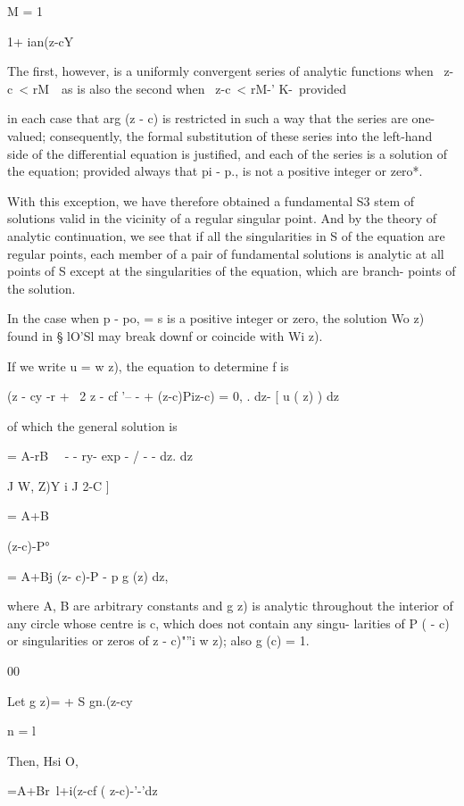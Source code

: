 M = 1

1+ ian(z-cY

The first, however, is a uniformly convergent series of analytic
functions when \ z-c\ < rM~\ as is also the second when \ z-c\ < rM-'
K-\ provided

%
%

in each case that arg (z - c) is restricted in such a way that the
series are one-valued; consequently, the formal substitution of these
series into the left-hand side of the differential equation is
justified, and each of the series is a solution of the equation;
provided always that pi - p., is not a positive integer or zero*.

With this exception, we have therefore obtained a fundamental S3 stem
of solutions valid in the vicinity of a regular singular point. And by
the theory of analytic continuation, we see that if all the
singularities in S of the equation are regular points, each member of
a pair of fundamental solutions is analytic at all points of S except
at the singularities of the equation, which are branch- points of the
solution.


In the case when p - po, = s is a positive integer or zero, the
solution Wo z) found in § lO'Sl may break downf or coincide with Wi
z).

If we write u = w z), the equation to determine f is

(z - cy -r + \ 2 z - cf '-- - + (z-c)Piz-c) = 0, . dz- [ u ( z) ) dz

of which the general solution is

 = A-rB\ ~ - - ry- exp - / - - dz. dz

J W, Z)Y i J 2-C ]

= A+B

(z-c)-P°

= A+Bj (z- c)-P - p g (z) dz,

where A, B are arbitrary constants and g z) is analytic throughout the
interior of any circle whose centre is c, which does not contain any
singu- larities of P ( - c) or singularities or zeros of z - c)"''i w
z); also g (c) = 1.

00

Let g z)= + S gn.(z-cy\

n = l

Then, Hsi O,

 =A+Br\ l+i(z-cf ( z-c)-'-'dz

